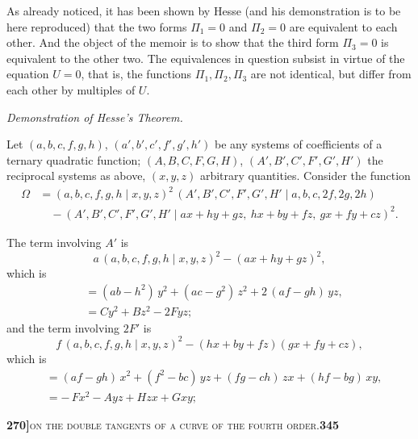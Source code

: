 \documentclass[11pt]{article}
\newcommand{\Cdel}{\mid}
\begin{document}
\medskip

\noindent As already noticed, it has been shown by Hesse (and his demonstration is to be here reproduced) that the two forms $\Pi_1 = 0$ and $\Pi_2 = 0$ are equivalent to each other. And the object of the memoir is to show that the third form $\Pi_3 = 0$ is equivalent to the other two. The equivalences in question subsist in virtue of the equation $U = 0$, that is, the functions $\Pi_1, \Pi_2, \Pi_3$ are not identical, but differ from each other by multiples of $U$.

\medskip

\begin{center}\textit{Demonstration of Hesse's Theorem.}\end{center}

\medskip

\noindent Let $(a, b, c, f, g, h)$, $(a', b', c', f', g', h')$ be any systems of coefficients of a ternary quadratic function; $(A, B, C, F, G, H)$, $(A', B', C', F', G', H')$ the reciprocal systems as above, $(x, y, z)$ arbitrary quantities. Consider the function
\[
\begin{aligned}
   \Omega &= (a, b, c, f, g, h\Cdel x, y, z)^2\,(A', B', C', F', G', H'\Cdel a, b, c, 2 f, 2 g, 2 h)\\
   &\quad{} - (A', B', C', F', G', H'\Cdel a x + h y + g z,\ h x + b y + f z,\ g x + f y + c z)^2.
\end{aligned}
\]

\medskip

\noindent The term involving $A'$ is
\[
   a\,(a, b, c, f, g, h\Cdel x, y, z)^2 - (a x + h y + g z)^2,
\]
which is
\[
\begin{aligned}
   &= (a b - h^2)\,y^2 + (a c - g^2)\,z^2 + 2\,(a f - g h)\,y z,\\
   &= C y^2 + B z^2 - 2 F y z;
\end{aligned}
\]
and the term involving $2 F'$ is
\[
   f\,(a, b, c, f, g, h\Cdel x, y, z)^2 - (h x + b y + f z)(g x + f y + c z),
\]
which is
\[
\begin{aligned}
   &= (a f - g h)\,x^2 + (f^2 - b c)\,y z + (f g - c h)\,z x + (h f - b g)\,x y,\\
   &= -\,F x^2 - A y z + H z x + G x y;
\end{aligned}
\]

\newpage
\setcounter{page}{345}

\noindent\textbf{270]}\hfill\textsc{on the double tangents of a curve of the fourth order.}\hfill\textbf{345}
\end{document}
